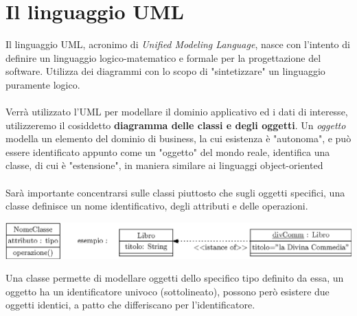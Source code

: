 \documentclass[12pt, letterpaper]{article}
\newcommand{\acc}{\\\hphantom{}\\}
\begin{document}
 \section{Il linguaggio UML}
Il linguaggio UML, acronimo di \textit{Unified Modeling Language}, nasce con l'intento di definire un 
linguaggio logico-matematico e formale per la progettazione del software. Utilizza dei diagrammi con lo scopo di 
"sintetizzare" un linguaggio puramente logico. \acc 
Verrà utilizzato l'UML per modellare il dominio applicativo ed i dati di interesse, utilizzeremo il cosiddetto 
\textbf{diagramma delle classi e degli oggetti}. Un \textit{oggetto} modella un elemento del dominio di business, 
la cui esistenza è "autonoma", e può essere identificato appunto come un "oggetto" del mondo reale, identifica una classe, 
di cui è "estensione", in maniera similare ai linguaggi object-oriented\acc Sarà importante concentrarsi sulle classi 
piuttosto che sugli oggetti specifici, una classe definisce un nome identificativo, degli attributi e delle 
operazioni.\begin{center}
    \includegraphics[width=\textwidth ]{images/umlBase.eps}
\end{center}
Una classe permette di modellare oggetti dello specifico tipo definito da essa, un oggetto ha un identificatore 
univoco (sottolineato), possono però esistere due oggetti identici, a patto che differiscano per 
l'identificatore.
\end{document}
